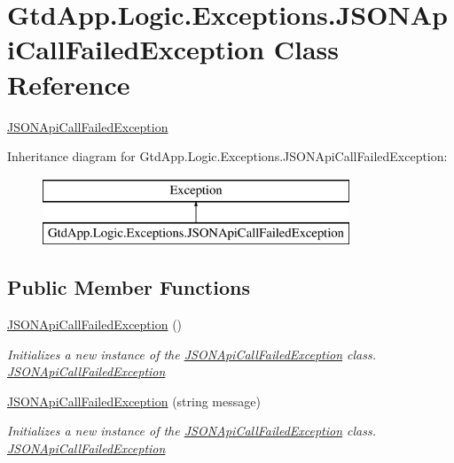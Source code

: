 \hypertarget{class_gtd_app_1_1_logic_1_1_exceptions_1_1_j_s_o_n_api_call_failed_exception}{}\section{Gtd\+App.\+Logic.\+Exceptions.\+J\+S\+O\+N\+Api\+Call\+Failed\+Exception Class Reference}
\label{class_gtd_app_1_1_logic_1_1_exceptions_1_1_j_s_o_n_api_call_failed_exception}


\mbox{\hyperlink{class_gtd_app_1_1_logic_1_1_exceptions_1_1_j_s_o_n_api_call_failed_exception}{J\+S\+O\+N\+Api\+Call\+Failed\+Exception}}  


Inheritance diagram for Gtd\+App.\+Logic.\+Exceptions.\+J\+S\+O\+N\+Api\+Call\+Failed\+Exception\+:\begin{figure}[H]
\begin{center}
\leavevmode
\includegraphics[height=2.000000cm]{class_gtd_app_1_1_logic_1_1_exceptions_1_1_j_s_o_n_api_call_failed_exception}
\end{center}
\end{figure}
\subsection*{Public Member Functions}
\begin{DoxyCompactItemize}
\item 
\mbox{\hyperlink{class_gtd_app_1_1_logic_1_1_exceptions_1_1_j_s_o_n_api_call_failed_exception_a5c66d3284adb007a7df8119378114001}{J\+S\+O\+N\+Api\+Call\+Failed\+Exception}} ()
\begin{DoxyCompactList}\small\item\em Initializes a new instance of the \mbox{\hyperlink{class_gtd_app_1_1_logic_1_1_exceptions_1_1_j_s_o_n_api_call_failed_exception}{J\+S\+O\+N\+Api\+Call\+Failed\+Exception}} class. \mbox{\hyperlink{class_gtd_app_1_1_logic_1_1_exceptions_1_1_j_s_o_n_api_call_failed_exception}{J\+S\+O\+N\+Api\+Call\+Failed\+Exception}} \end{DoxyCompactList}\item 
\mbox{\hyperlink{class_gtd_app_1_1_logic_1_1_exceptions_1_1_j_s_o_n_api_call_failed_exception_a713bed646a987c0bddf0382705b40f1f}{J\+S\+O\+N\+Api\+Call\+Failed\+Exception}} (string message)
\begin{DoxyCompactList}\small\item\em Initializes a new instance of the \mbox{\hyperlink{class_gtd_app_1_1_logic_1_1_exceptions_1_1_j_s_o_n_api_call_failed_exception}{J\+S\+O\+N\+Api\+Call\+Failed\+Exception}} class. \mbox{\hyperlink{class_gtd_app_1_1_logic_1_1_exceptions_1_1_j_s_o_n_api_call_failed_exception}{J\+S\+O\+N\+Api\+Call\+Failed\+Exception}} \end{DoxyCompactList}\end{DoxyCompactItemize}


